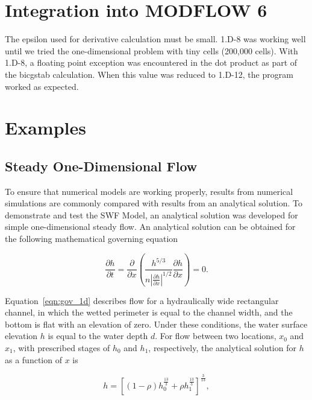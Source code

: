 \documentclass[fleqn]{article}
\begin{document}
\section{Integration into MODFLOW 6}

The epsilon used for derivative calculation must be small.  1.D-8 was working well until we tried the one-dimensional problem with tiny cells (200,000 cells).  With 1.D-8, a floating point exception was encountered in the dot product as part of the bicgstab calculation.  When this value was reduced to 1.D-12, the program worked as expected.

\newpage
\section{Examples}


\subsection{Steady One-Dimensional Flow}

To ensure that numerical models are working properly, results from numerical simulations are commonly compared with results from an analytical solution.  To demonstrate and test the SWF Model, an analytical solution was developed for simple one-dimensional steady flow.  An analytical solution can be obtained for the following mathematical governing equation

\begin{equation}
  \frac{\partial h}{\partial t} = \frac{\partial}{\partial x} 
  \left ( \frac{h^{5/3}}{n \left | \frac{\partial h}{\partial x} \right |^{1/2}} 
  \frac{\partial h}{\partial x} \right ) = 0 .
  \label{eqn:gov_1d}
\end{equation}

\noindent Equation~\ref{eqn:gov_1d} describes flow for a hydraulically wide rectangular channel, in which the wetted perimeter is equal to the channel width, and the bottom is flat with an elevation of zero.  Under these conditions, the water surface elevation $h$ is equal to the water depth $d$.  For flow between two locations, $x_0$ and $x_1$, with prescribed stages of $h_0$ and $h_1$, respectively, the analytical solution for $h$ as a function of $x$ is

\begin{equation}
  h = \left [ \left (1 - \rho \right ) h^{\frac{13}{3}}_{0} + \rho h^{\frac{13}{3}}_{1} \right ]^{\frac{3}{13}} ,
  \label{eqn:asoln_1d}
\end{equation}
\end{document}
